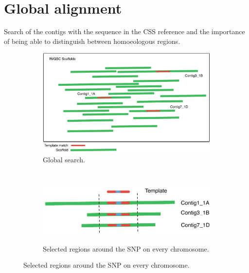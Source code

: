 \section{Global alignment} 
Search of the contigs with the sequence in the CSS reference and the importance of being able to distinguish between homoeologous regions. 


\begin{figure}
    \centering
    \begin{subfigure}[b]{0.4\textwidth}
        \includegraphics[width=1\textwidth]{PolyMarker/Figures/aln/scaffoldsSearch.pdf}
        \caption{Global search.}
        \label{fig:poly:globalSearch}
    \end{subfigure}
    ~ %
    \begin{subfigure}[b]{0.4\textwidth}
        \raisebox{10mm} { \includegraphics[width=1\textwidth]{PolyMarker/Figures/aln/scaffoldsFoundAround.pdf} }
        \caption{Selected regions around the SNP on every chromosome.}
        \label{fig:poly:globalAround}
    \end{subfigure}
    

\end{figure}
